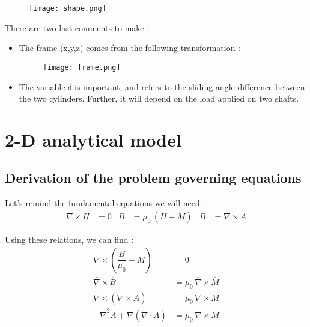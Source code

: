 \begin{figure}[H]
    \centering
    \texttt{[image: shape.png]}
\end{figure}

There are two last comments to make : 
\begin{itemize}
    \item The frame (x,y,z) comes from the following transformation : 

\begin{figure}[H]
    \centering
    \texttt{[image: frame.png]}
\end{figure}

\item The variable $\delta$ is important, and refers to the sliding angle difference between the two cylinders. Further, it will depend on the load applied on two shafts.
\end{itemize}


\section{2-D analytical model}

\subsection*{Derivation of the problem governing equations}

Let's remind the fundamental equations we will need :
\begin{align*}
    \overline{\nabla} \times \overline{H} &= \overline{0} &
    \overline{B} &= \mu_0\, ( \overline{H} + \overline{M} ) &
    \overline{B} &= \overline{\nabla} \times \overline{A}
\end{align*}

Using these relations, we can find :
\begin{align*}
\overline{\nabla} \times \left( \dfrac{\overline{B}}{\mu_0} - \overline{M} \right) &= \overline{0} \\
\overline{\nabla} \times \overline{B} &= \mu_0\, \overline{\nabla} \times \overline{M} \\
\overline{\nabla} \times \left( \overline{\nabla} \times \overline{A} \right) &= \mu_0\, \overline{\nabla} \times \overline{M} \\
- \overline{\nabla}^2 \overline{A} + \overline{\nabla} \left( \overline{\nabla} \cdot \overline{A} \right) &= \mu_0\, \overline{\nabla} \times \overline{M} 
\end{align*}


